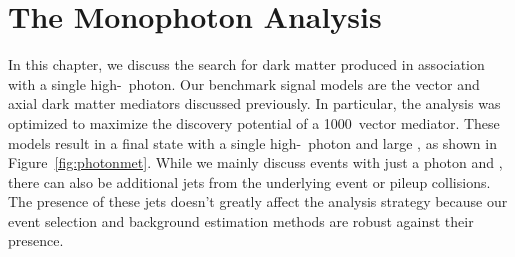 \chapter{The Monophoton Analysis}
\label{chap:analysis}

In this chapter, we discuss the search for dark matter produced in association with a single high-\pt\ photon.
Our benchmark signal models are the vector and axial dark matter mediators discussed previously.
In particular, the analysis was optimized to maximize the discovery potential of a 1000~\TeV vector mediator.
These models result in a final state with a single high-\pt\ photon and large \met, as shown in Figure~\ref{fig:photonmet}.
While we mainly discuss events with just a photon and \met, there can also be additional jets from the underlying event or pileup collisions.
The presence of these jets doesn't greatly affect the analysis strategy because our event selection and background estimation methods are robust against their presence.

